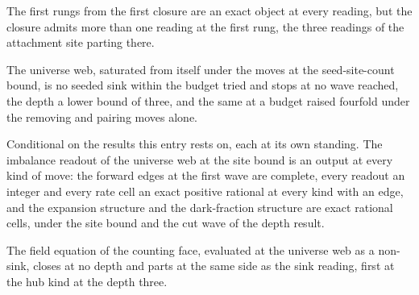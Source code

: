 \begin{chwall}\label{box:X-3-horizon-at-every-rung-and-the-horizon-web-as-a-seeded-saturation:3}
The first rungs from the first closure are an exact object at every reading, but the closure admits more than one reading at the first rung, the three readings of the attachment site parting there.
\end{chwall}
\begin{chwall}\label{box:X-3-horizon-at-every-rung-and-the-horizon-web-as-a-seeded-saturation:4}
The universe web, saturated from itself under the moves at the seed-site-count bound, is no seeded sink within the budget tried and stops at no wave reached, the depth a lower bound of three, and the same at a budget raised fourfold under the removing and pairing moves alone.
\end{chwall}
\begin{chconditional}\label{box:X-3-horizon-at-every-rung-and-the-horizon-web-as-a-seeded-saturation:5}
Conditional on the results this entry rests on, each at its own standing. The imbalance readout of the universe web at the site bound is an output at every kind of move: the forward edges at the first wave are complete, every readout an integer and every rate cell an exact positive rational at every kind with an edge, and the expansion structure and the dark-fraction structure are exact rational cells, under the site bound and the cut wave of the depth result.
\end{chconditional}
\begin{chwall}\label{box:X-3-horizon-at-every-rung-and-the-horizon-web-as-a-seeded-saturation:6}
The field equation of the counting face, evaluated at the universe web as a non-sink, closes at no depth and parts at the same side as the sink reading, first at the hub kind at the depth three.
\end{chwall}
